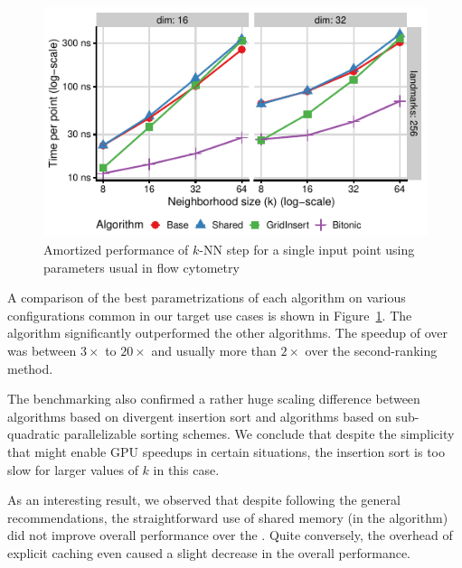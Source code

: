 \begin{figure}
	\centering
	\includegraphics{embedsom/final-plots/algs_knn_repre_ampere.pdf}
	\caption{Amortized performance of $k$-NN step for a single input point using parameters usual in flow cytometry}
	\label{fig:knn-result-repre}
\end{figure}

A comparison of the best parametrizations of each algorithm on various configurations common in our target use cases is shown in Figure~\ref{fig:knn-result-repre}.
The  algorithm significantly outperformed the other algorithms.
The speedup of  over  was between $3\times$ to $20\times$ and usually more than $2\times$ over the second-ranking method.

The benchmarking also confirmed a rather huge scaling difference between algorithms based on divergent insertion sort and algorithms based on sub-quadratic parallelizable sorting schemes.
We conclude that despite the simplicity that might enable GPU speedups in certain situations, the insertion sort is too slow for larger values of $k$ in this case.

As an interesting result, we observed that despite following the general recommendations, the straightforward use of shared memory (in the  algorithm) did not improve overall performance over the .
Quite conversely, the overhead of explicit caching even caused a slight decrease in the overall performance.



